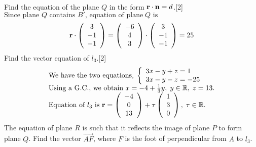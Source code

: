\documentclass[12pt, a4 paper]{article}
\begin{document}
\begin{outline}[enumerate]
\begin{align*}
					\end{align*}
					\color{black}
					\2	Find the equation of the plane $Q$ in the form ${\bf{r}} \cdot {\bf{n}} = d$.\hfill[2]
					\color{blue}\\
					${\textrm{Since plane }}Q{\textrm{ contains }}B'{\textrm{, equation of plane}}\;Q{\textrm{ is}}$
					\begin{align*}
						{\bf{r}} \cdot \left( {\begin{array}{*{20}{c}}3 \\{ - 1}\\{ - 1}\end{array}} \right) = \left( {\begin{array}{*{20}{c}}{ - 6}\\4\\3\end{array}} \right) \cdot \left( {\begin{array}{*{20}{c}}3\\{ - 1}\\{ - 1}\end{array}} \right) = 25
					\end{align*}
					\color{black}
					\2	Find the vector equation of ${l_3}$.\hfill[2]
					\color{blue}
					\[\begin{array}{l}{\textrm{We have the two equations,}}\;\left\{ \begin{array}{l}3x - y + z = 1\\3x - y - z =  - 25\end{array} \right.\\{\textrm{Using a G}}{\textrm{.C}}{\textrm{., we obtain }}x =  - 4 + \frac{1}{3}y,\;y \in \mathbb{R},\;z = 13.\\{\textrm{Equation of }}{l_3}{\textrm{ is }}{\bf{r}} = \left( {\begin{array}{*{20}{c}}{ - 4}\\0\\{13}\end{array}} \right) + \tau \left( {\begin{array}{*{20}{c}}1\\3\\0\end{array}} \right),\;\tau  \in \mathbb{R}.\end{array}\]
					\color{black}
					The equation of plane $R$ is such that it reflects the image of plane $P$ to form plane $Q$.
					\2	Find the vector $\overrightarrow {AF} $, where $F$ is the foot of perpendicular from $A$ to ${l_3}$. \\

\end{outline}
\end{document}
